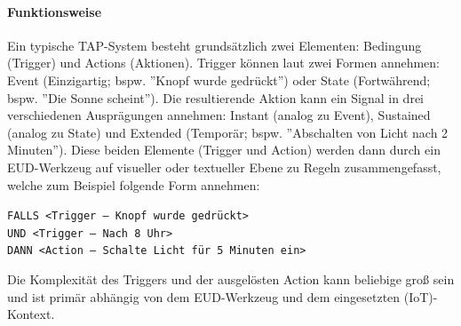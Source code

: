 \paragraph{Funktionsweise} Ein typische \ac{TAP}-System besteht grundsätzlich zwei Elementen: Bedingung (Trigger) und Actions (Aktionen). Trigger können laut \cite{huang2015supporting} zwei Formen annehmen: Event (Einzigartig; bspw. ''Knopf wurde gedrückt'') oder State (Fortwährend; bspw. ''Die Sonne scheint''). Die resultierende Aktion kann ein Signal in drei verschiedenen Ausprägungen annehmen: Instant (analog zu Event), Sustained (analog zu State) und Extended (Temporär; bspw. ''Abschalten von Licht nach 2 Minuten''). Diese beiden Elemente (Trigger und Action) werden dann durch ein \ac{EUD}-Werkzeug auf visueller oder textueller Ebene zu Regeln zusammengefasst, welche zum Beispiel folgende Form annehmen:

\texttt{FALLS <Trigger -- Knopf wurde gedrückt> \\ UND <Trigger -- Nach 8 Uhr> \\ DANN <Action -- Schalte Licht für 5 Minuten ein>}

Die Komplexität des Triggers und der ausgelösten Action kann beliebige groß sein und ist primär abhängig von dem \ac{EUD}-Werkzeug und dem eingesetzten (\ac{IoT})-Kontext.

